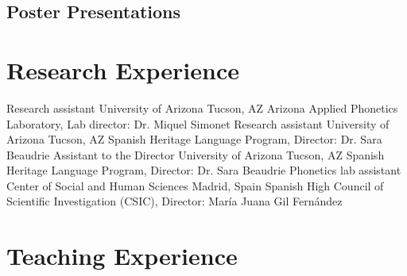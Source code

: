 \documentclass[12pt,letterpaper]{moderncv}
\begin{document}
\subsection{Poster Presentations}













\section{Research Experience}

        {Research assistant}
        {University of Arizona}
        {Tucson, AZ}
        {}
        {Arizona Applied Phonetics Laboratory, Lab director: Dr. Miquel Simonet}
        {Research assistant}
        {University of Arizona}
        {Tucson, AZ}
        {}
        {Spanish Heritage Language Program, Director: Dr. Sara Beaudrie}
        {Assistant to the Director}
        {University of Arizona}
        {Tucson, AZ}
        {}
        {Spanish Heritage Language Program, Director: Dr. Sara Beaudrie}
        {Phonetics lab assistant}
        {Center of Social and Human Sciences}
        {Madrid, Spain}
        {}
        {Spanish High Council of Scientific Investigation (CSIC), Director: Mar\'ia Juana Gil Fern\'andez}













\section{Teaching Experience}
\end{document}
